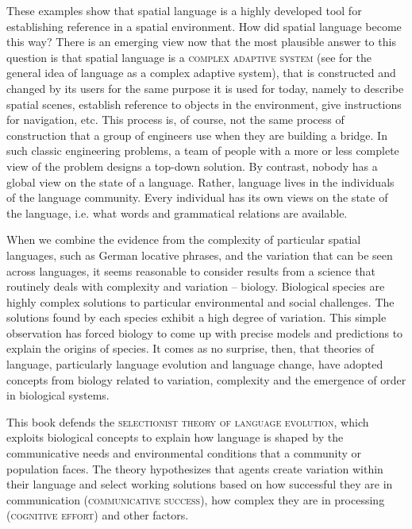 These examples show that spatial language is a highly developed tool for 
establishing reference in a spatial environment. How did spatial language 
become this way? There is an emerging view now that the most plausible answer 
to this question is that spatial language is a \textsc{complex adaptive system}
(see \citealp{steels2000language} for the general idea of language as a complex adaptive system), 
that is constructed and changed by its users for the same purpose it is used for today, 
namely to describe spatial scenes,
establish reference to objects in the environment, give instructions for navigation, etc.
This process is, of course, not the same process of construction that a group
of engineers use when they are building a bridge. In such classic engineering
problems, a team of people with a more or less complete view of the problem
designs a top-down solution. By contrast, nobody has a global view on the state 
of a language. Rather, language lives in the individuals of 
the language community. Every individual has 
its own views on the state of the language, i.e. what words and 
grammatical relations are available.

When we combine the evidence from the complexity of particular spatial languages,
such as German locative phrases, and the variation that can be seen across 
languages, it seems reasonable to consider results from a science 
that routinely deals with complexity and variation -- biology. Biological species are highly 
complex solutions to particular environmental and social challenges. The solutions
found by each species exhibit a high degree of variation. This simple observation has
forced biology to come up with precise models and predictions to explain the 
origins of species. It comes as no surprise, then, that theories of language, particularly 
language evolution and language change, have adopted concepts 
from biology related to variation, complexity and the emergence of order 
in biological systems.  

This book defends the \textsc{selectionist theory of language evolution},
which exploits biological concepts to explain how language is shaped 
by the communicative needs and environmental conditions that a 
community or population faces. 
The theory hypothesizes that agents create variation within their language 
and select working solutions based on how successful they are 
in communication (\textsc{communicative success}), 
how complex they are in processing (\textsc{cognitive effort}) and 
other factors. 

